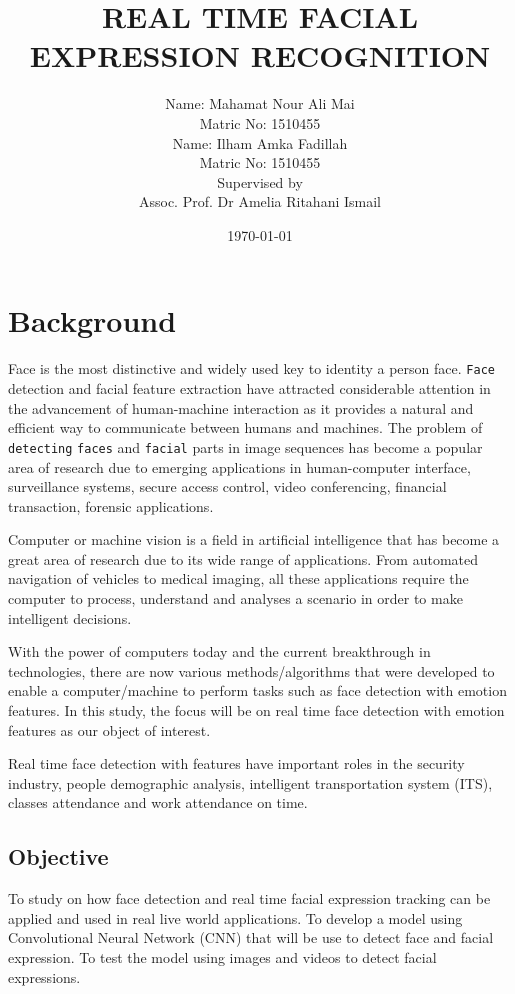 \documentclass[12pt]{report}
\title{\bf REAL TIME FACIAL EXPRESSION RECOGNITION }
\author{ Name: Mahamat Nour Ali Mai\\
	Matric No: 1510455 \\ 
	[1cm]
	Name: Ilham Amka Fadillah \\
	Matric No: 1510455\\
	[1cm]
	Supervised by\\
	[1.5cm]
	Assoc. Prof. Dr Amelia Ritahani Ismail\\}
\date{\today}
\begin{document}
                        
\maketitle                              
{}                   
\setcounter{page}{2}                    
\tableofcontents                        

\chapter{Background}               
Face is the most distinctive and widely used key to
identity a person face. \texttt{Face} detection and facial feature extraction have attracted considerable attention in the advancement of human-machine interaction as it provides a natural and efficient way to communicate between humans and machines. The problem of \texttt{detecting} \texttt{faces} and \texttt{facial} parts in image sequences has become a popular area of research due to emerging applications in human-computer interface, surveillance systems, secure access control, video conferencing, financial transaction, forensic applications.

Computer or machine vision is a field in artificial intelligence that has become a great area of research due to its wide range of applications. From automated navigation of vehicles to medical imaging, all these applications require the computer to process, understand and analyses a scenario in order to make intelligent decisions.

With the power of computers today and the current breakthrough in technologies,
there are now various methods/algorithms that were developed to enable a
computer/machine to perform tasks such as face detection with emotion features. In this study, the focus will be on real time face detection with emotion features as our object of interest. 

Real time face detection with features have important roles in the security industry,
people demographic analysis, intelligent transportation system (ITS), classes attendance and work attendance on time.

\section{Objective}                 
To study on how face detection and real time facial expression tracking can be applied and used in real live world applications. To develop a model using Convolutional Neural Network (CNN) that will be use to detect face and facial expression. To test the model using images and videos to detect facial expressions. 
\end{document}
